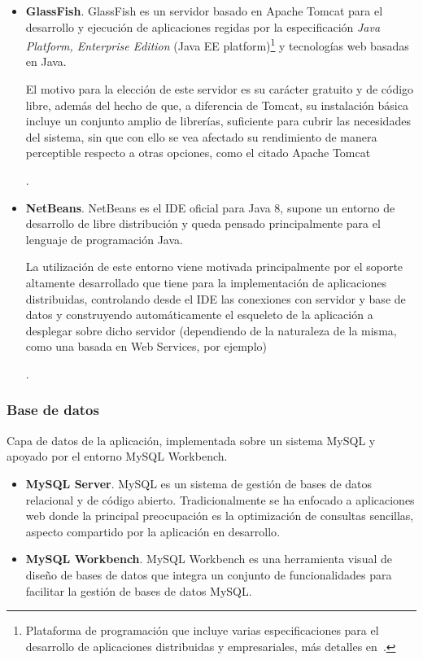 \begin{itemize}
	\item{\textbf{GlassFish}. GlassFish es un servidor basado en Apache Tomcat para el desarrollo y ejecución de aplicaciones regidas por la especificación \textit{Java Platform, Enterprise Edition} (Java EE platform)\footnote{Plataforma de programación que incluye varias especificaciones para el desarrollo de aplicaciones distribuidas y empresariales, más detalles en~\cite{OraEE}.} y tecnologías web basadas en Java.
	
	El motivo para la elección de este servidor es su carácter gratuito y de código libre, además del hecho de que, a diferencia de Tomcat, su instalación básica incluye un conjunto amplio de librerías, suficiente para cubrir las necesidades del sistema, sin que con ello se vea afectado su rendimiento de manera perceptible respecto a otras opciones, como el citado Apache Tomcat}.
	
	\item{\textbf{NetBeans}. NetBeans es el IDE oficial para Java 8, supone un entorno de desarrollo de libre distribución y queda pensado principalmente para el lenguaje de programación Java.
		
	La utilización de este entorno viene motivada principalmente por el soporte altamente desarrollado que tiene para la implementación de aplicaciones distribuidas, controlando desde el IDE las conexiones con servidor y base de datos y construyendo automáticamente el esqueleto de la aplicación a desplegar sobre dicho servidor (dependiendo de la naturaleza de la misma, como una basada en Web Services, por ejemplo)}.
\end{itemize}

\subsubsection{Base de datos}

Capa de datos de la aplicación, implementada sobre un sistema MySQL y apoyado por el entorno MySQL Workbench.

\begin{itemize}
	\item{\textbf{MySQL Server}. MySQL es un sistema de gestión de bases de datos relacional y de código abierto. Tradicionalmente se ha enfocado a aplicaciones web donde la principal preocupación es la optimización de consultas sencillas, aspecto compartido por la aplicación en desarrollo}.	
	
	\item{\textbf{MySQL Workbench}. MySQL Workbench es una herramienta visual de diseño de bases de datos que integra un conjunto de funcionalidades para facilitar la gestión de bases de datos MySQL}.
\end{itemize}

